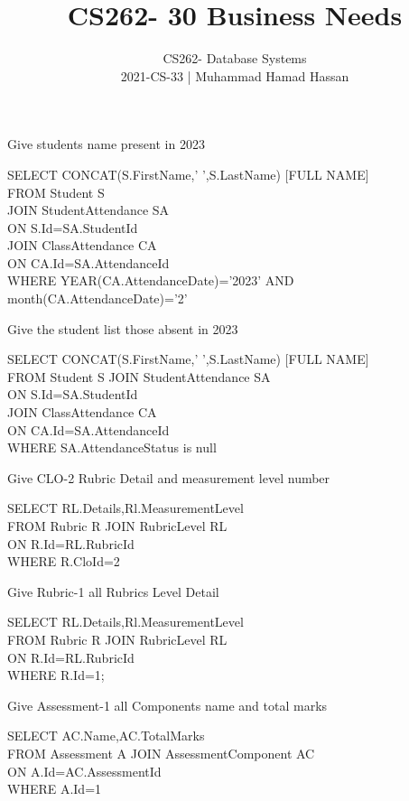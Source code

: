 \documentclass[10pt,a4paper]{article}
\newenvironment{problem}[2][Problem]{\begin{trivlist}
\item[\hskip \labelsep {\bfseries #1}\hskip \labelsep {\bfseries #2.}]}{\end{trivlist}}
\begin{document}
 
\title{CS262- 30 Business Needs }
\author{
CS262- Database Systems\\
2021-CS-33 | Muhammad Hamad Hassan\\}
\maketitle
\noindent
\begin{problem}{1}
Give students name present in 2023
\end{problem}
SELECT CONCAT(S.FirstName,' ',S.LastName) [FULL NAME]\\
FROM Student S \\
JOIN StudentAttendance SA \\
ON S.Id=SA.StudentId \\
JOIN ClassAttendance CA \\
ON CA.Id=SA.AttendanceId \\
WHERE YEAR(CA.AttendanceDate)='2023'  AND month(CA.AttendanceDate)='2'

\begin{problem}{2}
Give the student list those absent in 2023
\end{problem}
SELECT CONCAT(S.FirstName,' ',S.LastName) [FULL NAME]\\
FROM Student S JOIN StudentAttendance SA \\
ON S.Id=SA.StudentId\\
JOIN ClassAttendance CA\\
ON CA.Id=SA.AttendanceId\\
WHERE SA.AttendanceStatus is null 

\begin{problem}{3}
Give CLO-2 Rubric Detail and measurement level number
\end{problem}
SELECT RL.Details,Rl.MeasurementLevel\\
FROM Rubric R JOIN  RubricLevel RL\\
ON R.Id=RL.RubricId\\
WHERE R.CloId=2

\begin{problem}{4}
Give Rubric-1 all Rubrics Level Detail
\end{problem}
SELECT RL.Details,Rl.MeasurementLevel\\
FROM Rubric R JOIN  RubricLevel RL\\
ON R.Id=RL.RubricId\\
WHERE R.Id=1;

\begin{problem}{5}
Give Assessment-1 all Components name and total marks
\end{problem}
SELECT AC.Name,AC.TotalMarks\\
FROM Assessment A JOIN AssessmentComponent AC\\
ON A.Id=AC.AssessmentId\\
WHERE A.Id=1
\end{document}
